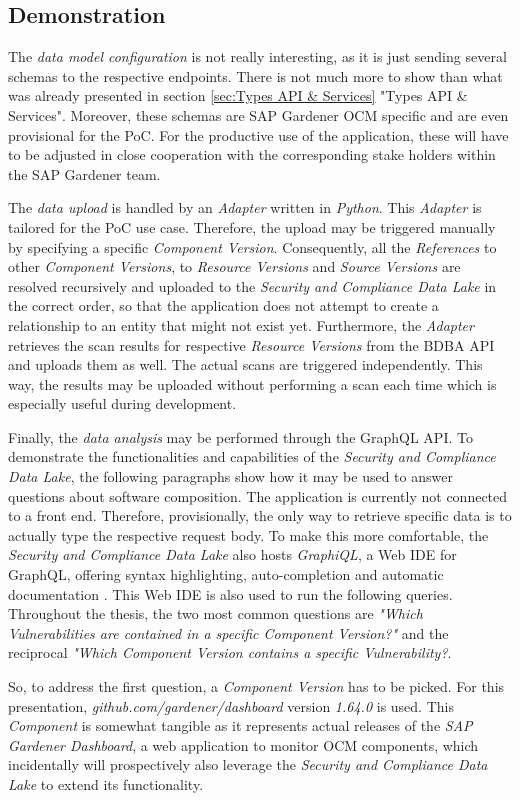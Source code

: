 \subsection{Demonstration}
The \emph{data model configuration} is not really interesting, as it is just sending several schemas to the respective endpoints. There is not much more to show than what was already presented in section \ref{sec:Types API & Services} "Types API \& Services". Moreover, these schemas are SAP Gardener OCM specific and are even provisional for the PoC. For the productive use of the application, these will have to be adjusted in close cooperation with the corresponding stake holders within the SAP Gardener team.\par
The \emph{data upload} is handled by an \emph{Adapter} written in \emph{Python}. This \emph{Adapter} is tailored for the PoC use case. Therefore, the upload may be triggered manually by specifying a specific \emph{Component Version}. Consequently, all the \emph{References} to other \emph{Component Versions}, to \emph{Resource Versions} and  \emph{Source Versions} are resolved recursively and uploaded to the \emph{Security and Compliance Data Lake} in the correct order, so that the application does not attempt to create a relationship to an entity that might not exist yet. Furthermore, the \emph{Adapter} retrieves the scan results for respective \emph{Resource Versions} from the BDBA API and uploads them as well. The actual scans are triggered independently. This way, the results may be uploaded without performing a scan each time which is especially useful during development.\par
Finally, the \emph{data analysis} may be performed through the GraphQL API. To demonstrate the functionalities and capabilities of the \emph{Security and Compliance Data Lake}, the following paragraphs show how it may be used to answer questions about software composition. The application is currently not connected to a front end. Therefore, provisionally, the only way to retrieve specific data is to actually type the respective request body. To make this more comfortable, the \emph{Security and Compliance Data Lake} also hosts \emph{GraphiQL}, a Web IDE for GraphQL, offering syntax highlighting, auto-completion and automatic documentation \cite{graphiql}. This Web IDE is also used to run the following queries.\\

Throughout the thesis, the two most common questions are \emph{"Which Vulnerabilities are contained in a specific Component Version?"} and the reciprocal \emph{"Which Component Version contains a specific Vulnerability?}.\par
So, to address the first question, a \emph{Component Version} has to be picked. For this presentation, \emph{github.com/gardener/dashboard} version \emph{1.64.0} is used. This \emph{Component} is somewhat tangible as it represents actual releases of the \emph{SAP Gardener Dashboard}, a web application to monitor OCM components, which incidentally will prospectively also leverage the \emph{Security and Compliance Data Lake} to extend its functionality.

